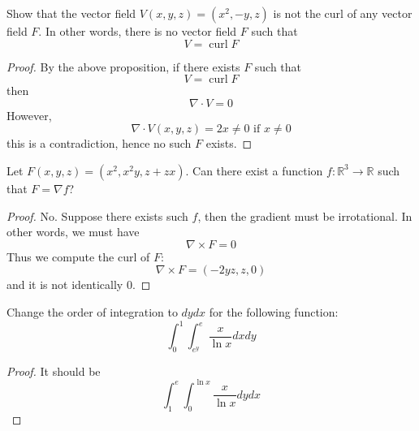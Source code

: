 \documentclass[openany]{book}
\newcommand{\R}{\mathbb{R}}
\newcommand{\curl}{\operatorname{curl}}
\begin{document}
\begin{prob}
    Show that the vector field $V(x,y,z)=(x^2, -y, z)$ is not the curl of any vector field $F$. In other words, there is no vector field $F$ such that 
    \begin{equation*}
        V=\curl F
    \end{equation*}
\end{prob}
\begin{proof}
    By the above proposition, if there exists $F$ such that 
    \begin{equation*}
        V=\curl F
    \end{equation*}
    then 
    \begin{equation*}
        \nabla\cdot V=0
    \end{equation*}
    However, 
    \begin{equation*}
        \nabla\cdot V(x,y,z)=2x\neq 0 \text{ if } x\neq 0
    \end{equation*}
    this is a contradiction, hence no such $F$ exists.
\end{proof}




\begin{prob}
    Let $F(x,y,z)=(x^2, x^2y, z+zx)$. Can there exist a function $f:\R^3\to\R$ such that $F=\nabla f$?
\end{prob}
\begin{proof}
    No. Suppose there exists such $f$, then the gradient must be irrotational. In other words, we must have 
    \begin{equation*}
        \nabla\times F=0
    \end{equation*}
    Thus we compute the curl of $F$:
    \begin{equation*}
        \nabla\times F=(-2yz, z, 0)
    \end{equation*}
    and it is not identically $0$.
\end{proof}






\begin{prob}
    Change the order of integration to $dydx$ for the following function:
    \begin{equation*}
        \int_0^1\int_{e^y}^{e}\frac{x}{\ln x}dxdy
    \end{equation*}
\end{prob}
\begin{proof}
    It should be 
    \begin{equation*}
        \int_1^e\int_{0}^{\ln x}\frac{x}{\ln x}dydx
    \end{equation*}
\end{proof}
\end{document}
